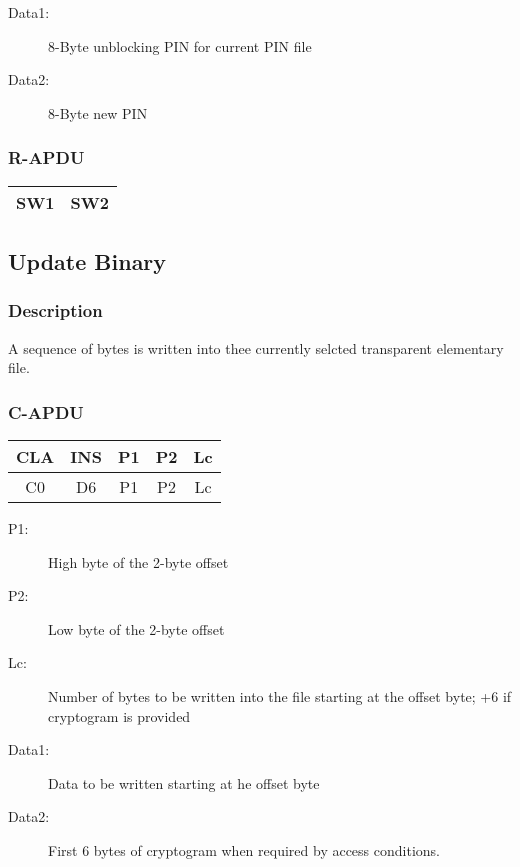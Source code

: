 \documentclass[a4paper,oneside]{article}
\begin{document}
\begin{description}
\item[Data1:] 8-Byte unblocking PIN for current PIN file
\item[Data2:] 8-Byte new PIN
\end{description}

\subsubsection*{R-APDU}

\begin{tabular}{|c|c|} \hline
SW1 & SW2 \\ \hline
\end{tabular}


\subsection{Update Binary}

\subsubsection*{Description}

A sequence of bytes is written into thee currently selcted transparent
elementary file.

\subsubsection*{C-APDU}

\begin{tabular}{|c|c|c|c|c|} \hline
CLA & INS & P1 & P2 & Lc \\ \hline \hline
C0 & D6 & P1 & P2 & Lc \\ \hline
\end{tabular}

\begin{description}
\item[P1:] High byte of the 2-byte offset
\item[P2:] Low byte of the 2-byte offset
\item[Lc:] Number of bytes to be written into the file starting at
     the offset byte; +6 if cryptogram is provided
\item[Data1:] Data to be written starting at he offset byte
\item[Data2:] First 6 bytes of cryptogram when required by access conditions.
\end{description}
\end{document}
